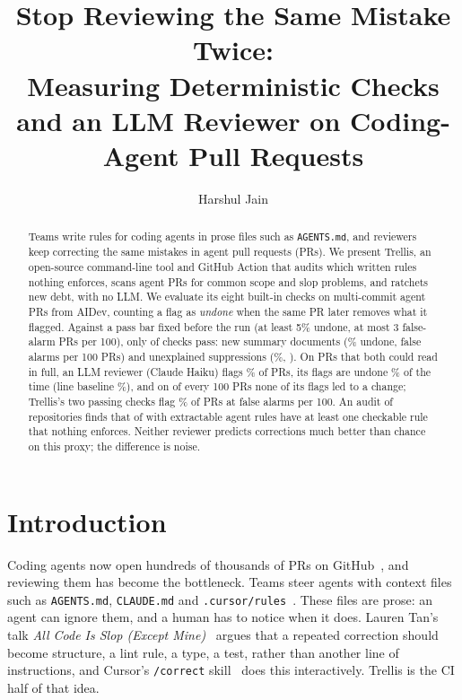 \documentclass[sigconf]{acmart}
\begin{document}
\sloppy
\title{Stop Reviewing the Same Mistake Twice:\\ Measuring Deterministic Checks and an LLM Reviewer on Coding-Agent Pull Requests}
\author{Harshul Jain}
\begin{abstract}
Teams write rules for coding agents in prose files such as \texttt{AGENTS.md}, and reviewers keep correcting the same mistakes in agent pull requests (PRs). We present Trellis, an open-source command-line tool and GitHub Action that audits which written rules nothing enforces, scans agent PRs for common scope and slop problems, and ratchets new debt, with no LLM. We evaluate its eight built-in checks on \nPRs{} multi-commit agent PRs from AIDev, counting a flag as \emph{undone} when the same PR later removes what it flagged. Against a pass bar fixed before the run (at least 5\% undone, at most 3 false-alarm PRs per 100), only \nPass{} of \nChecks{} checks pass: new summary documents (\undoneScopeNewDoc\% undone, \faScopeNewDoc{} false alarms per 100 PRs) and unexplained suppressions (\undoneBareSuppression\%, \faBareSuppression). On \lPRs{} PRs that both could read in full, an LLM reviewer (Claude Haiku) flags \lLlmAllPct\% of PRs, its flags are undone \lLlmAllUndone\% of the time (line baseline \lBase\%), and on \lLlmAllFa{} of every 100 PRs none of its flags led to a change; Trellis's two passing checks flag \lTrTwoPct\% of PRs at \lTrTwoFa{} false alarms per 100. An audit of \aSampled{} repositories finds that \aReposWithUnenforcedCheckableRule{} of \aWithRules{} with extractable agent rules have at least one checkable rule that nothing enforces. Neither reviewer predicts corrections much better than chance on this proxy; the difference is noise.
\end{abstract}
\maketitle

\section{Introduction}
Coding agents now open hundreds of thousands of PRs on GitHub~\cite{li2026aidev}, and reviewing them has become the bottleneck. Teams steer agents with context files such as \texttt{AGENTS.md}, \texttt{CLAUDE.md} and \texttt{.cursor/rules}~\cite{chatlatanagulchai2025agentreadmes}. These files are prose: an agent can ignore them, and a human has to notice when it does. Lauren Tan's talk \emph{All Code Is Slop (Except Mine)}~\cite{tan2026slop} argues that a repeated correction should become structure, a lint rule, a type, a test, rather than another line of instructions, and Cursor's \texttt{/correct} skill~\cite{pstack} does this interactively. Trellis is the CI half of that idea.
\end{document}
